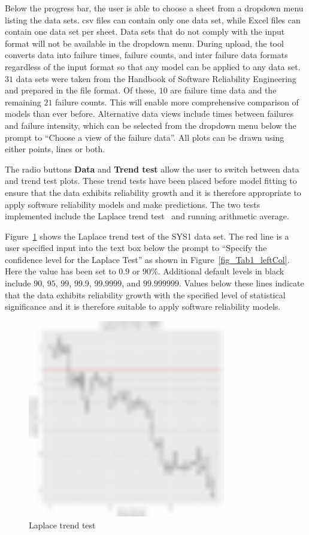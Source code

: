 \documentclass[conference]{IEEEtran}
\begin{document}
Below the progress bar, the user is able to choose a sheet from a dropdown menu listing the data sets. csv files can contain only one data set, while Excel files can contain one data set per sheet. Data sets that do not comply with the input format will not be available in the dropdown menu. During upload, the tool converts data into failure times, failure counts, and inter failure data formats regardless of the input format so that any model can be applied to any data set. $31$ data sets were taken from the Handbook of Software Reliability Engineering~\cite{BookHoSRE} and prepared in the file format. Of these, $10$ are failure time data and the remaining $21$ failure counts. This will enable more comprehensive comparison of models than ever before. Alternative data views include times between failures and failure intensity, which can be selected from the dropdown menu below the prompt to ``Choose a view of the failure data''. All plots can be drawn using either points, lines or both.

The radio buttons \textbf{Data} and \textbf{Trend test} allow the user to switch between data and trend test plots. These trend tests have been placed before model fitting to ensure that the data exhibits reliability growth and it is therefore appropriate to apply software reliability models and make predictions. The two tests implemented include the Laplace trend test~\cite{gaudoin1992optimal} and running arithmetic average.

Figure~\ref{fig_Tab1_Laplace} shows the Laplace trend test of the SYS1 data set. The red line is a user specified input into the text box below the prompt to ``Specify the confidence level for the Laplace Test'' as shown in Figure~\ref{fig_Tab1_leftCol}. Here the value has been set to $0.9$ or $90\%$. Additional default levels in black include $90$, $95$, $99$, $99.9$, $99.9999$, and $99.999999$. Values below these lines indicate that the data exhibits reliability growth with the specified level of statistical significance and it is therefore suitable to apply software reliability models.

\begin{figure}[!h]
\centering
\includegraphics[width=3.4in]{Figures/SRT3}
\caption{Laplace trend test}
\label{fig_Tab1_Laplace}
\end{figure}
\end{document}

